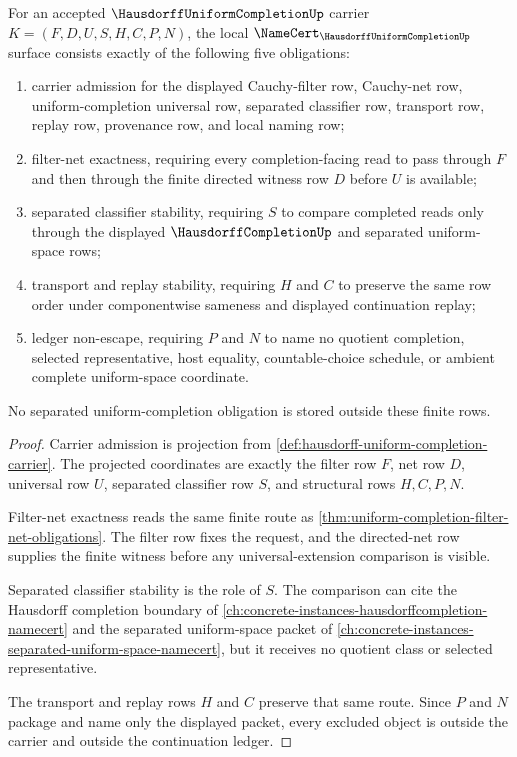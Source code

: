 \begin{theorem}
\label{thm:hausdorff-uniform-completion-namecert-obligations}
For an accepted $\HausdorffUniformCompletionUp$ carrier $K=(F,D,U,S,H,C,P,N)$, the local $\NameCert_{\HausdorffUniformCompletionUp}$ surface consists exactly of the following five obligations:
\begin{enumerate}
\item carrier admission for the displayed Cauchy-filter row, Cauchy-net row, uniform-completion universal row, separated classifier row, transport row, replay row, provenance row, and local naming row;
\item filter-net exactness, requiring every completion-facing read to pass through $F$ and then through the finite directed witness row $D$ before $U$ is available;
\item separated classifier stability, requiring $S$ to compare completed reads only through the displayed $\HausdorffCompletionUp$ and separated uniform-space rows;
\item transport and replay stability, requiring $H$ and $C$ to preserve the same row order under componentwise sameness and displayed continuation replay;
\item ledger non-escape, requiring $P$ and $N$ to name no quotient completion, selected representative, host equality, countable-choice schedule, or ambient complete uniform-space coordinate.
\end{enumerate}
No separated uniform-completion obligation is stored outside these finite rows.
\end{theorem}
\begin{proof}
Carrier admission is projection from \autoref{def:hausdorff-uniform-completion-carrier}. The projected coordinates are exactly the filter row $F$, net row $D$, universal row $U$, separated classifier row $S$, and structural rows $H,C,P,N$.

Filter-net exactness reads the same finite route as \autoref{thm:uniform-completion-filter-net-obligations}. The filter row fixes the request, and the directed-net row supplies the finite witness before any universal-extension comparison is visible.

Separated classifier stability is the role of $S$. The comparison can cite the Hausdorff completion boundary of \autoref{ch:concrete-instances-hausdorffcompletion-namecert} and the separated uniform-space packet of \autoref{ch:concrete-instances-separated-uniform-space-namecert}, but it receives no quotient class or selected representative.

The transport and replay rows $H$ and $C$ preserve that same route. Since $P$ and $N$ package and name only the displayed packet, every excluded object is outside the carrier and outside the continuation ledger.
\end{proof}


